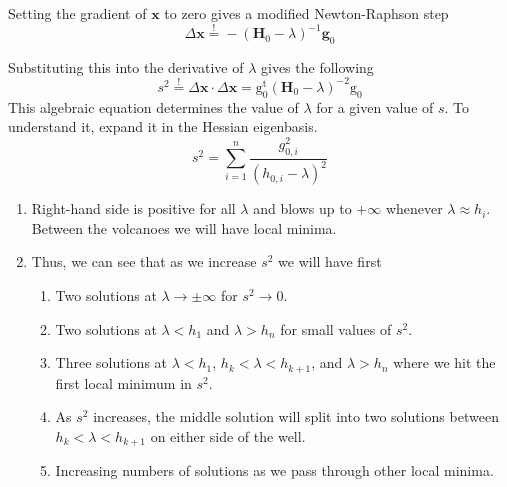 \documentclass[11pt]{article}
\begin{document}
\noindent
Setting the gradient of \(\mathbf{x}\) to zero gives a modified Newton-Raphson
step
\[
    \Delta\mathbf{x}
    \overset{!}{=}
    -
    (\mathbf{H}_0 - \lambda)^{-1}
    \mathbf{g}_0
\]

\noindent
Substituting this into the derivative of \(\lambda\) gives the following
\[
    s^2
    \overset{!}{=}
    \Delta\mathbf{x}\cdot\Delta\mathbf{x}
    =
    \mathrm{g}_0^\mathrm{t}
    (\mathbf{H}_0 - \lambda)^{-2}
    \mathrm{g}_0
\]
This algebraic equation determines the value of \(\lambda\) for a given value of
\(s\).
To understand it, expand it in the Hessian eigenbasis.
\[
    s^2
    =
    \sum_{i=1}^n
    \frac{g_{0,i}^2}{(h_{0,i} - \lambda)^2}
\]
\begin{enumerate}
    \item
        Right-hand side is positive for all \(\lambda\) and blows up to
        \(+\infty\) whenever \(\lambda\approx h_i\).
        Between the volcanoes we will have local minima.
    \item
        Thus, we can see that as we increase \(s^2\) we will have first
        \begin{enumerate}
            \item
                Two solutions at \(\lambda\rightarrow\pm\infty\) for
                \(s^2\rightarrow0\).
            \item
                Two solutions at \(\lambda<h_1\) and \(\lambda>h_n\) for small
                values of \(s^2\).
            \item
                Three solutions at \(\lambda<h_1\), \(h_k<\lambda<h_{k+1}\), and
                \(\lambda>h_n\) where we hit the first local minimum in \(s^2\).
            \item
                As \(s^2\) increases, the middle solution will split into two
                solutions between \(h_k<\lambda<h_{k+1}\) on either side of the
                well.
            \item
                Increasing numbers of solutions as we pass through other local
                minima.
        \end{enumerate}
\end{enumerate}
\end{document}
